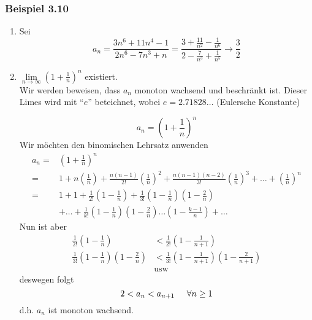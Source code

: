 \subsubsection*{Beispiel 3.10}
\begin{enumerate}
\item Sei \[{a_n} = \frac{{3{n^6} + 11{n^4} - 1}}{{2{n^6} - 7{n^3} + n}} = \frac{{3 + \frac{{11}}{{{n^2}}} - \frac{1}{{{n^6}}}}}{{2 - \frac{7}{{{n^3}}} + \frac{1}{{{n^5}}}}} \to \frac{3}{2}\]
\item $\mathop {\lim }\limits_{n \to \infty } {\left( {1 + \frac{1}{n}} \right)^n}$ existiert. \\

Wir werden beweisen, dass $a_n$ monoton wachsend und beschränkt ist. Dieser Limes wird mit ``$e$'' beteichnet, wobei $e=2.71828\dots$ (Eulersche Konstante)
\begin{beweis}{}
\[a_n={\left( {1 + \frac{1}{n}} \right)^n}\]
Wir möchten den binomischen Lehrsatz anwenden
\begin{align*}
{a_n} =&{\left( {1 + \frac{1}{n}} \right)^n}\\
=&1 + n\left( {\frac{1}{n}} \right) + \frac{{n(n - 1)}}{{2!}}{\left( {\frac{1}{n}} \right)^2} + \frac{{n(n - 1)(n - 2)}}{{3!}}{\left( {\frac{1}{n}} \right)^3} +  \ldots  + {\left( {\frac{1}{n}} \right)^n}\\
=&1 + 1 + \frac{1}{{2!}}\left( {1 - \frac{1}{n}} \right) + \frac{1}{{3!}}\left( {1 - \frac{1}{n}} \right)\left( {1 - \frac{2}{n}} \right)\\
&+\ldots  + \frac{1}{{k!}}\left( {1 - \frac{1}{n}} \right)\left( {1 - \frac{2}{n}} \right) \ldots \left( {1 - \frac{{k - 1}}{n}} \right) +  \ldots
\end{align*}
Nun ist aber
\begin{align*}
\frac{1}{{2!}}\left( {1 - \frac{1}{n}} \right)&< \frac{1}{{2!}}\left( {1 - \frac{1}{{n + 1}}} \right)\\
\frac{1}{{3!}}\left( {1 - \frac{1}{n}} \right)\left( {1 - \frac{2}{n}} \right)&< \frac{1}{{3!}}\left( {1 - \frac{1}{{n + 1}}} \right)\left( {1 - \frac{2}{{n + 1}}} \right)\\
&\text{usw}
\end{align*}
deswegen folgt \[2 < a_n < a_{n+1}\hspace{5mm}\forall n\geq 1\]
d.h. $a_n$ ist monoton wachsend.\\


\end{beweis}
\end{enumerate}
